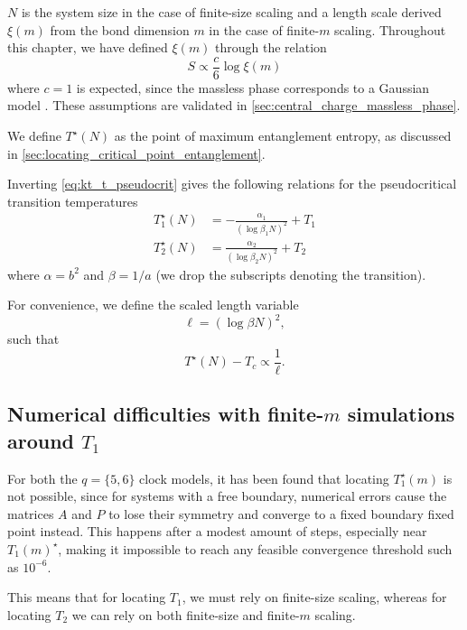 $N$ is the system size in the case of finite-size scaling and a length scale derived $\xi(m)$ from the bond dimension
$m$ in the case of finite-$m$ scaling.
Throughout this chapter, we have defined $\xi(m)$ through the relation
\begin{equation}\label{eq:entropy_as_function_of_xi2}
  S \propto \frac{c}{6} \log \xi(m)
\end{equation}
where $c = 1$ is expected, since the massless phase corresponds to a Gaussian model \cite{kosterlitz1974critical}.
These assumptions are validated in \autoref{sec:central_charge_massless_phase}.

We define $T^{\star}(N)$ as the point of maximum entanglement entropy, as discussed in
\autoref{sec:locating_critical_point_entanglement}.

Inverting \autoref{eq:kt_t_pseudocrit} gives the following relations for the pseudocritical transition temperatures
\begin{align}
  T^{\star}_{1}(N) &= -\frac{\alpha_1}{(\log \beta_1 N)^2} + T_1 \\
  T^{\star}_{2}(N) &= \frac{\alpha_2}{(\log \beta_2 N)^2} + T_2
\end{align}
where $\alpha = b^2$ and $\beta = 1/a$ (we drop the subscripts denoting the transition).

For convenience, we define the scaled length variable
\begin{equation}\label{eq:scaled_length_scale_kt}
  \ell = (\log \beta N)^2,
\end{equation}
such that
\begin{equation}
  T^{\star}(N) - T_c \propto \frac{1}{\ell}.
\end{equation}

\subsection{Numerical difficulties with finite-$m$ simulations around $T_1$}\label{sec:numerical_difficulties_t1}

For both the $q = \{5, 6\}$ clock models, it has been found that locating $T_1^{\star}(m)$ is not possible,
since for systems with a free boundary, numerical errors cause the matrices $A$ and $P$ to lose their symmetry and
converge to a fixed boundary fixed point instead.
This happens after a modest amount of steps, especially near $T_1(m)^{\star}$,
making it impossible to reach any feasible convergence threshold such as $10^{-6}$.

This means that for locating $T_1$, we must rely on finite-size scaling,
whereas for locating $T_2$ we can rely on both finite-size and finite-$m$ scaling.

